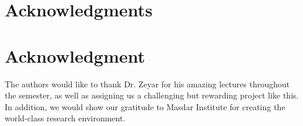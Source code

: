 \documentclass[12pt,journal,compsoc]{IEEEtran}
\begin{document}
%



\appendices



\ifCLASSOPTIONcompsoc
  \section*{Acknowledgments}
\else
  \section*{Acknowledgment}
\fi


The authors would like to thank Dr. Zeyar for his amazing lectures throughout the semester, as well as assigning us a challenging but rewarding project like this. In addition, we would show our gratitude to Masdar Institute for creating the world-class research environment.


\ifCLASSOPTIONcaptionsoff
  \newpage
\fi
\end{document}
